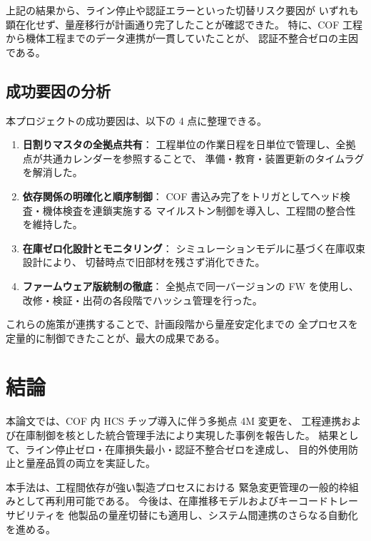 \documentclass[journal,twocolumn]{IEEEtran}
\begin{document}
上記の結果から、ライン停止や認証エラーといった切替リスク要因が
いずれも顕在化せず、量産移行が計画通り完了したことが確認できた。
特に、COF 工程から機体工程までのデータ連携が一貫していたことが、
認証不整合ゼロの主因である。

\subsection{成功要因の分析}
本プロジェクトの成功要因は、以下の 4 点に整理できる。

\begin{enumerate}
  \item \textbf{日割りマスタの全拠点共有}：  
  工程単位の作業日程を日単位で管理し、全拠点が共通カレンダーを参照することで、
  準備・教育・装置更新のタイムラグを解消した。
  
  \item \textbf{依存関係の明確化と順序制御}：  
  COF 書込み完了をトリガとしてヘッド検査・機体検査を連鎖実施する
  マイルストン制御を導入し、工程間の整合性を維持した。
  
  \item \textbf{在庫ゼロ化設計とモニタリング}：  
  シミュレーションモデルに基づく在庫収束設計により、
  切替時点で旧部材を残さず消化できた。
  
  \item \textbf{ファームウェア版統制の徹底}：  
  全拠点で同一バージョンの FW を使用し、
  改修・検証・出荷の各段階でハッシュ管理を行った。
\end{enumerate}

これらの施策が連携することで、計画段階から量産安定化までの
全プロセスを定量的に制御できたことが、最大の成果である。

\section{結論}

本論文では、COF 内 HCS チップ導入に伴う多拠点 4M 変更を、
工程連携および在庫制御を核とした統合管理手法により実現した事例を報告した。
結果として、ライン停止ゼロ・在庫損失最小・認証不整合ゼロを達成し、
目的外使用防止と量産品質の両立を実証した。

本手法は、工程間依存が強い製造プロセスにおける
緊急変更管理の一般的枠組みとして再利用可能である。
今後は、在庫推移モデルおよびキーコードトレーサビリティを
他製品の量産切替にも適用し、システム間連携のさらなる自動化を進める。

\end{document}
